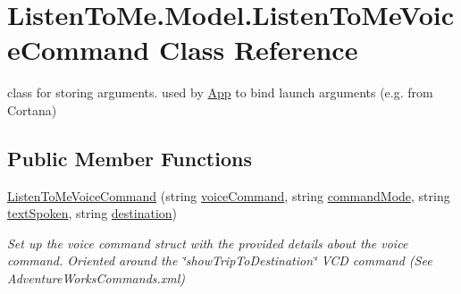\hypertarget{class_listen_to_me_1_1_model_1_1_listen_to_me_voice_command}{}\section{Listen\+To\+Me.\+Model.\+Listen\+To\+Me\+Voice\+Command Class Reference}
\label{class_listen_to_me_1_1_model_1_1_listen_to_me_voice_command}


class for storing arguments. used by \hyperlink{class_listen_to_me_1_1_app}{App} to bind launch arguments (e.\+g. from Cortana)  


\subsection*{Public Member Functions}
\begin{DoxyCompactItemize}
\item 
\hyperlink{class_listen_to_me_1_1_model_1_1_listen_to_me_voice_command_a3da9ccddfb33c7b23eb9ae0ca4c9b39c}{Listen\+To\+Me\+Voice\+Command} (string \hyperlink{class_listen_to_me_1_1_model_1_1_listen_to_me_voice_command_ac1ab4ff605dddd6dfe7f038e46cf522e}{voice\+Command}, string \hyperlink{class_listen_to_me_1_1_model_1_1_listen_to_me_voice_command_a6243f032e7b44a3de833ae4362150b53}{command\+Mode}, string \hyperlink{class_listen_to_me_1_1_model_1_1_listen_to_me_voice_command_af82e41e09f7b7888d1ce9f6a0fa9ada8}{text\+Spoken}, string \hyperlink{class_listen_to_me_1_1_model_1_1_listen_to_me_voice_command_a2d2a8120188ed1a16fefbb2461ab20f2}{destination})
\begin{DoxyCompactList}\small\item\em Set up the voice command struct with the provided details about the voice command. Oriented around the \char`\"{}show\+Trip\+To\+Destination\char`\"{} V\+CD command (See Adventure\+Works\+Commands.\+xml) \end{DoxyCompactList}\end{DoxyCompactItemize}
